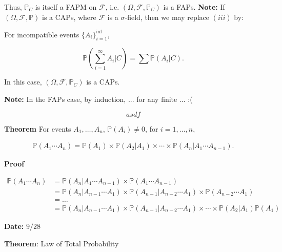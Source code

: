 \documentclass[12pt]{article}
\newcommand{\prob}[1]{\mathbb{P}(#1)}
\begin{document}
\vspace*{.3cm}
\noindent
Thus, $\mathbb{P}_C$ is itself a FAPM on $\mathcal{F}$, i.e. $(\Omega, \mathcal{F}, \mathbb{P}_C)$ is a FAPs. \textbf{Note: } If $(\Omega, \mathcal{F}, \mathbb{P})$ is a CAPs, where $\mathcal{F}$ is a $\sigma$-field, then we may replace $(iii)$ by:

\begin{tcolorbox}
For incompatible events $\{A_i\}_{i=1}^{\inf}$,

\begin{equation*}
\prob{\sum_{i=1}^{\infty} A_i \lvert C} = \sum_{}^{} \prob{A_i \lvert C}.
\end{equation*}

\noindent
In this case, $(\Omega, \mathcal{F}, \mathbb{P}_C)$ is a CAPs. 

\textbf{Note:} In the FAPs case, by induction, ... for any finite ... :( 

\begin{equation*}
asdf
\end{equation*}
\end{tcolorbox}

\noindent
\textbf{Theorem} For events $A_1, \ldots, A_n$, $\prob{A_i} \neq 0$, for $i = 1, \ldots, n$,

\begin{align*}
\prob{A_1 \cdots A_n} = \prob{A_1} \times \prob{A_2 \lvert A_1} \times \cdots \times \prob{A_n \lvert A_1 \cdots A_{n-1}}.
\end{align*}

\noindent
\textbf{Proof} 

\begin{align*}
\prob{A_1 \cdots A_n} & = \prob{A_n \lvert A_1 \cdots A_{n-1}} \times \prob{A_1 \cdots A_{n-1}} \\
& = \prob{A_n \lvert A_{n-1} \cdots A_{1}} \times \prob{A_{n-1} \lvert A_{n-2} \cdots A_{1}} \times \prob{A_{n-2} \cdots A_{1}} \\
& = \ldots \\
& = \prob{A_n \lvert A_{n-1} \cdots A_{1}} \times \prob{A_{n-1} \lvert A_{n-2} \cdots A_{1}} \times \cdots \times \prob{A_{2} \lvert  A_1} \prob{A_1} 
\end{align*}

\begin{flushright}
\textbf{Date:} $9/28$
\end{flushright}

\noindent
\textbf{Theorem}: Law of Total Probability
\end{document}
